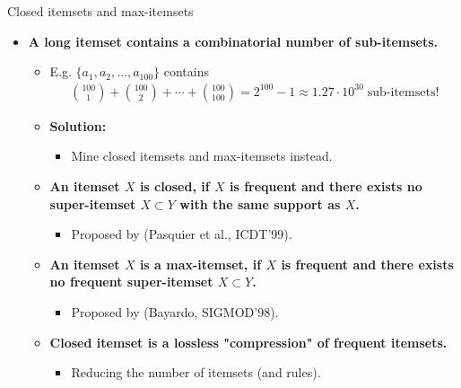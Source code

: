 \documentclass[aspectratio=169,t]{beamer}
\begin{document}
  { 
    \begin{frame}{Closed itemsets and max-itemsets}
    \begin{itemize}
      \item \textbf{A long itemset contains a combinatorial number of sub-itemsets.}
      \begin{itemize}
        \item E.g. $\{a_1,a_2,\ldots,a_{100}\}$ contains
        \begin{align}
        {100\choose 1} + {100 \choose 2} + \cdots + {100 \choose 100} = 2^{100}-1 \approx 1.27 \cdot 10^{30} \; \text{sub-itemsets!}
        \end{align}
        \item \textbf{Solution:}
        \begin{itemize}
          \item Mine closed itemsets and max-itemsets instead.
        \end{itemize}
        \item \textbf{An itemset $X$ is closed, if $X$ is frequent and there exists no super-itemset $X \subset Y$ with the same support as $X$.}
        \begin{itemize}
          \item Proposed by (Pasquier et al., ICDT'99).
        \end{itemize}
        \item \textbf{An itemset $X$ is a max-itemset, if $X$ is frequent and there exists no frequent super-itemset $X \subset Y$.}
        \begin{itemize}
          \item Proposed by (Bayardo, SIGMOD'98).
        \end{itemize}
        \item \textbf{Closed itemset is a lossless "compression" of frequent itemsets.}
        \begin{itemize}
          \item Reducing the number of itemsets (and rules).
        \end{itemize}
      \end{itemize}
    \end{itemize}
    \end{frame}
  }
\end{document}
